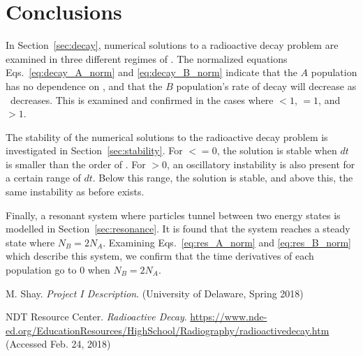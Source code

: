 \documentclass[pra,twocolumn,showpacs,amsmath,amssymb]{revtex4-1}
\begin{document}
\section{Conclusions} \label{sec:conclusion}

In Section~\ref{sec:decay}, numerical solutions to a radioactive decay problem
are examined in three different regimes of \trel. The normalized equations
Eqs.~\ref{eq:decay_A_norm} and \ref{eq:decay_B_norm} indicate that the $A$ population
has no dependence on \trel, and that the $B$ population's rate of decay will
decrease as \trel~decreases. This is examined and confirmed in the cases where \trel$<1$,
\trel$=1$, and \trel$>1$.

The stability of the numerical solutions to the radioactive decay problem is
investigated in Section~\ref{sec:stability}. For \trel$<=0$, the solution is
stable when $dt$ is smaller than the order of \trel. For \trel$>0$, an
oscillatory instability is also present for a certain range of $dt$. Below this
range, the solution is stable, and above this, the same instability as before exists.

Finally, a resonant system where particles tunnel between two energy states
is modelled in Section~\ref{sec:resonance}. It is found that the system reaches
a steady state where $N_B = 2 N_A$. Examining Eqs.~\ref{eq:res_A_norm} and
\ref{eq:res_B_norm} which describe this system, we confirm that the time
derivatives of each population go to 0 when $N_B = 2 N_A$.

\begin{thebibliography}{1}
M. Shay.
\textit{Project I Description}.
(University of Delaware, Spring 2018)

NDT Resource Center.
\textit{Radioactive Decay}.
\url{https://www.nde-ed.org/EducationResources/HighSchool/Radiography/radioactivedecay.htm}
(Accessed Feb. 24, 2018)
\end{thebibliography}
\end{document}

